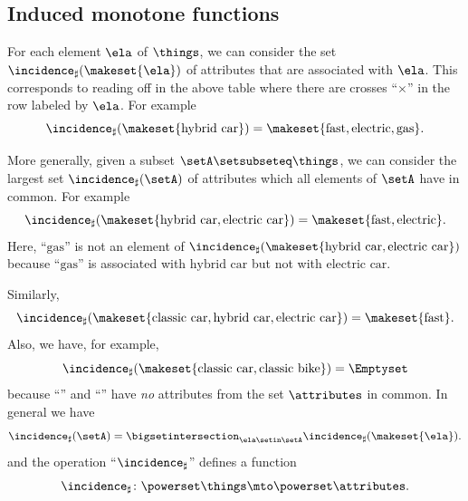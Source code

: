 \subsection{Induced monotone functions}

For each element $\ela$ of $\things$, we can consider the set $\incidence_\sharp(\makeset{\ela})$ of attributes that are associated with $\ela$.
This corresponds to reading off in the above table where there are crosses ``$\times$'' in the row labeled by $\ela$.
For example
\begin{equation}\label{eq:fca-example-pushforward-1}
    \incidence_\sharp(\makeset{\text{hybrid car}}) = \makeset{\text{fast}, \text{electric}, \text{gas}}.
\end{equation}

More generally, given a subset $\setA \setsubseteq \things$, we can consider the largest set $\incidence_\sharp(\setA)$ of attributes which all elements of $\setA$ have in common.
For example
\begin{equation}\label{eq:fca-example-pushforward-2}
    \incidence_\sharp(\makeset{\text{hybrid car}, \text{electric car}}) = \makeset{\text{fast}, \text{electric}}.
\end{equation}
Here, ``$\text{gas}$'' is not an element of $\incidence_\sharp(\makeset{\text{hybrid car}, \text{electric car}})$ because ``$\text{gas}$'' is associated with $\text{hybrid car}$ but not with $\text{electric car}$.

Similarly,
\begin{equation}\label{eq:fca-example-pushforward-3}
    \incidence_\sharp(\makeset{\text{classic car}, \text{hybrid car}, \text{electric car}}) = \makeset{\text{fast}}.
\end{equation}
Also, we have, for example,
\begin{equation}\label{eq:fca-example-pushforward-4}
    \incidence_\sharp(\makeset{\text{classic car}, \text{classic bike}}) = \Emptyset
\end{equation}
because ``'' and ``'' have \emph{no} attributes from the set $\attributes$ in common.
In general we have
\begin{equation}\label{eq:fca-example-pushforward-5}
    \incidence_\sharp(\setA) = \bigsetintersection_{\ela \setin \setA} \incidence_\sharp(\makeset{\ela}).
\end{equation}
and the operation ``$\incidence_\sharp$'' defines a function
\begin{equation}\label{eq:fca-example-pushforward-6}
    \incidence_\sharp \colon \powerset \things \mto \powerset \attributes.
\end{equation}

